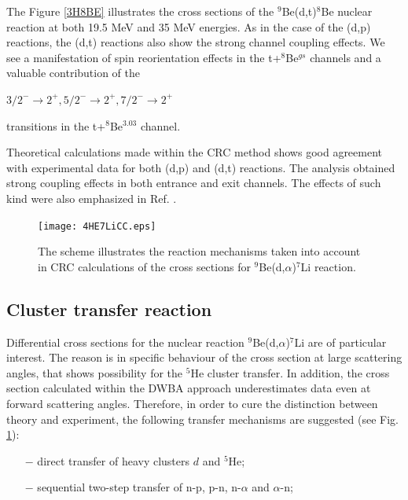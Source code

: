 \documentclass[10pt]{iopart}
\begin{document}
The Figure \ref{3H8BE} illustrates the cross sections of the ${}^9$Be(d,t)${}^{8}$Be nuclear reaction at both 19.5 MeV and 35 MeV energies. As in the case of the (d,p) reactions, the (d,t) reactions also show the strong channel coupling effects. We see a manifestation of spin reorientation effects in the t+$^8$Be$^{gs}$ channels and a valuable contribution of the  \begin{small}
$3/2^- \rightarrow 2^+, 5/2^- \rightarrow 2^+, 7/2^-\rightarrow 2^+$
\end{small} transitions in the t+$^8$Be$^{3.03}$ channel.

Theoretical calculations made within the CRC method shows good agreement with experimental data for both (d,p)  and (d,t) reactions.
The analysis obtained strong coupling effects in both entrance and exit channels. The effects of such kind were also emphasized in Ref. \cite{harakeh1980, rudchik2016}.

\begin{figure}[tp]
\centering
\texttt{[image: 4HE7LiCC.eps]}
\caption{\label{4He7LICC} The scheme illustrates the reaction mechanisms taken into account in CRC calculations of the cross sections for ${}^9$Be(d,$\alpha$)${}^7$Li reaction.}
\end{figure}	

\subsection{Cluster transfer reaction}
Differential cross sections for the nuclear reaction ${^9}$Be(d,$\alpha$)${}^7$Li are of particular interest. The reason is in specific behaviour of the cross section at large scattering angles, that shows possibility for the ${}^5$He cluster transfer. In addition, the cross section calculated within the DWBA approach underestimates data even at forward scattering angles. Therefore, in order to cure the distinction between theory and experiment, the following transfer mechanisms are suggested (see Fig. \ref{4He7LICC}):
\begin{itemize}
\item[$-$] direct transfer of heavy clusters $d$ and ${}^5$He;
\item[$-$] sequential two-step transfer of n-p, p-n, n-$\alpha$ and $\alpha$-n;
\end{itemize}
\end{document}
